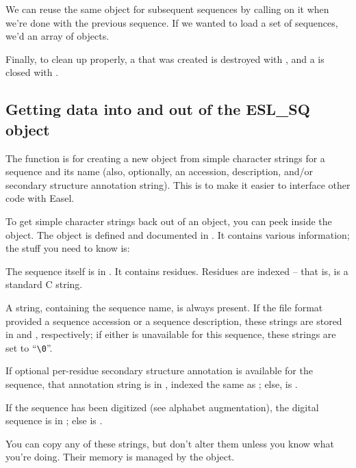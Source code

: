 We can reuse the same  object for subsequent sequences
by calling  on it when we're done with the
previous sequence. If we wanted to load a set of sequences, we'd
 an array of  objects. 

Finally, to clean up properly, a  that was created is
destroyed with , and a 
is closed with .

\subsection{Getting data into and out of the ESL\_SQ object}

The  function is for creating a new
 object from simple character strings for a sequence
and its name (also, optionally, an accession, description, and/or
secondary structure annotation string). This is to make it easier to
interface other code with Easel.

To get simple character strings back out of an  object,
you can peek inside the object. The object is defined and documented
in . It contains various information; the stuff you
need to know is:



The sequence itself is in . It contains 
residues. Residues are indexed  -- that is, 
is a standard C string. 

A  string, containing the sequence name, is always
present. If the file format provided a sequence accession or a
sequence description, these strings are stored in  and
, respectively; if either is unavailable for this
sequence, these strings are set to ``\verb+\0+''.

If optional per-residue secondary structure annotation is available
for the sequence, that annotation string is in , indexed the
same as ; else,  is .

If the sequence has been digitized (see alphabet augmentation), the
 digital sequence is in ; else  is
.

You can copy any of these strings, but don't alter them unless you
know what you're doing. Their memory is managed by the 
object.


